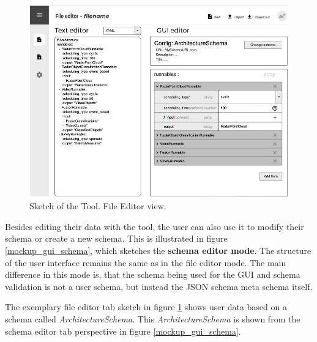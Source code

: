 \begin{figure}[!t]
    \includegraphics[width=\textwidth]{figures/mockup_gui_config}
    \caption{Sketch of the Tool. File Editor view.}
    \label{mockup_gui_config}
\end{figure}



Besides editing their data with the tool, the user can also use it to modify their schema or create a new schema.
This is illustrated in figure \ref{mockup_gui_schema}, which sketches the \textbf{schema editor mode}.
The structure of the user interface remains the same as in the file editor mode.
The main difference in this mode is, that the schema being used for the GUI and schema validation is not a user schema, but instead the JSON schema meta schema itself.

The exemplary file editor tab sketch in figure \ref{mockup_gui_config} shows user data based on a schema called \textit{ArchitectureSchema}.
This \textit{ArchitectureSchema} is shown from the schema editor tab perspective in figure \ref{mockup_gui_schema}.

